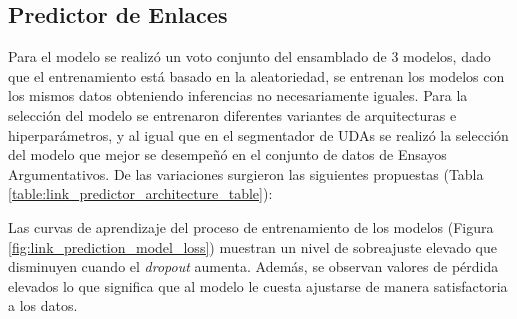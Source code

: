 \documentclass[a4paper,11pt,twocolumn,twoside]{article}
\begin{document}
\subsection{Predictor de Enlaces}


Para el modelo se realizó un voto conjunto del ensamblado de 3 modelos, dado que el entrenamiento 
está basado en la aleatoriedad, se entrenan los modelos con los mismos datos obteniendo inferencias no
necesariamente iguales.
Para la selección del modelo se entrenaron diferentes variantes de arquitecturas e hiperparámetros, y 
al igual que en el segmentador de UDAs se realizó la selección del modelo que mejor se desempeñó en 
el conjunto de datos de Ensayos Argumentativos. De las variaciones surgieron las siguientes propuestas
(Tabla \ref{table:link_predictor_architecture_table}):

\begin{table}[h]
	\begin{center}
	\end{center}
	\caption{\label{table:link_predictor_architecture_table}Variantes de arquitectura de los modelos de predicción de enlaces.}
\end{table}

Las curvas de aprendizaje del proceso de entrenamiento de los modelos (Figura \ref{fig:link_prediction_model_loss}) 
muestran un nivel de sobreajuste 
elevado que disminuyen cuando el \textit{dropout} aumenta. Además, se observan valores de pérdida elevados lo que significa 
que al modelo le cuesta ajustarse de manera satisfactoria a los datos.
\end{document}
